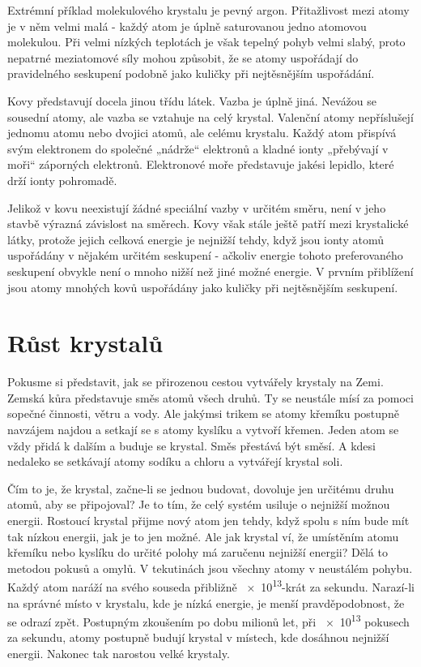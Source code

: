    Extrémní příklad molekulového krystalu je pevný argon. Přitažlivost mezi atomy je v něm velmi 
    malá - každý atom je úplně saturovanou jedno atomovou molekulou. Při velmi nízkých teplotách je 
    však tepelný pohyb velmi slabý, proto nepatrné meziatomové síly mohou způsobit, že se atomy 
    uspořádají do pravidelného seskupení podobně jako kuličky při nejtěsnějším uspořádání.
    
    Kovy představují docela jinou třídu látek. Vazba je úplně jiná. Nevážou se sousední atomy, ale 
    vazba se vztahuje na celý krystal. Valenční atomy nepříslušejí jednomu atomu nebo dvojici 
    atomů, ale celému krystalu. Každý atom přispívá svým elektronem do společné „nádrže“ elektronů 
    a kladné ionty „přebývají v moři“ záporných elektronů. Elektronové moře představuje jakési 
    lepidlo, které drží ionty pohromadě.
    
    Jelikož v kovu neexistují žádné speciální vazby v určitém směru, není v jeho stavbě výrazná 
    závislost na směrech. Kovy však stále ještě patří mezi krystalické látky, protože jejich 
    celková energie je nejnižší tehdy, když jsou ionty atomů uspořádány v nějakém určitém seskupení 
    - ačkoliv energie tohoto preferovaného seskupení obvykle není o mnoho nižší než jiné možné 
    energie. V prvním přiblížení jsou atomy mnohých kovů uspořádány jako kuličky při nejtěsnějším 
    seskupení.
    
  \section{Růst krystalů}\label{fyz:IIchapXXXsecIII}
    Pokusme si představit, jak se přirozenou cestou vytvářely krystaly na Zemi. Zemská kůra 
    představuje směs atomů všech druhů. Ty se neustále mísí za pomoci sopečné činnosti, větru a 
    vody. Ale jakýmsi trikem se atomy křemíku postupně navzájem najdou a setkají se s atomy kyslíku 
    a vytvoří křemen. Jeden atom se vždy přidá k dalším a buduje se krystal. Směs přestává být 
    směsí. A kdesi nedaleko se setkávají atomy sodíku a chloru a vytvářejí krystal soli.
    
    Čím to je, že krystal, začne-li se jednou budovat, dovoluje jen určitému druhu atomů, aby se 
    připojoval? Je to tím, že celý systém usiluje o nejnižší možnou energii. Rostoucí krystal 
    přijme nový atom jen tehdy, když spolu s ním bude mít tak nízkou energii, jak je to jen možné. 
    Ale jak krystal ví, že umístěním atomu křemíku nebo kyslíku do určité polohy má zaručenu 
    nejnižší energii? Dělá to metodou pokusů a omylů. V tekutinách jsou všechny atomy v neustálém 
    pohybu. Každý atom naráží na svého souseda přibližně \num{e13}-krát za sekundu. Narazí-li na 
    správné místo v krystalu, kde je nízká energie, je menší pravděpodobnost, že se odrazí zpět. 
    Postupným zkoušením po dobu milionů let, při \num{e13} pokusech za sekundu, atomy postupně 
    budují krystal v místech, kde dosáhnou nejnižší energii. Nakonec tak narostou velké krystaly.
    
